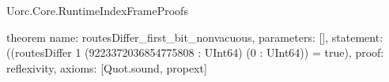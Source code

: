 \begin{lexlean}{Uorc.Core.RuntimeIndexFrameProofs}
\begin{semanticmodule}
theorem{
  name: routesDiffer_first_bit_nonvacuous,
  parameters: [],
  statement: ((routesDiffer 1 (9223372036854775808 : UInt64) (0 : UInt64)) = true),
  proof: reflexivity{},
  axioms: [Quot.sound, propext]
}
\end{semanticmodule}
\end{lexlean}
